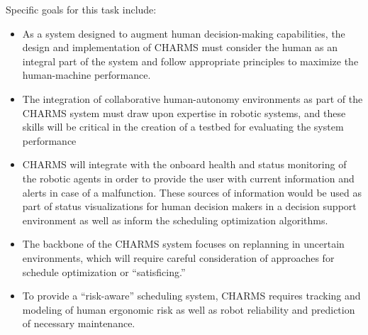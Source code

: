 Specific goals for this task include: 
\begin{itemize}
    \item As a system designed to augment human decision-making capabilities, the design and implementation of CHARMS must consider the human as an integral part of the system and follow appropriate principles to maximize the human-machine performance. 
    \item The integration of collaborative human-autonomy environments as part of the CHARMS system must draw upon expertise in robotic systems, and these skills will be critical in the creation of a testbed for evaluating the system performance
    \item CHARMS will integrate with the onboard health and status monitoring of the robotic agents in order to provide the user with current information and alerts in case of a malfunction. These sources of information would be used as part of status visualizations for human decision makers in a decision support environment as well as inform the scheduling optimization algorithms. 
    \item The backbone of the CHARMS system focuses on replanning in uncertain environments, which will require careful consideration of approaches for schedule optimization or ``satisficing.''
    \item To provide a ``risk-aware'' scheduling system, CHARMS requires tracking and modeling of human ergonomic risk as well as robot reliability and prediction of necessary maintenance.
\end{itemize}

